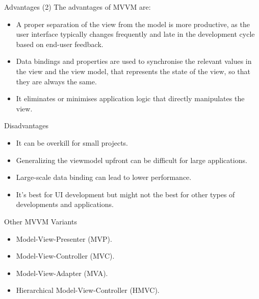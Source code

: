 \documentclass[aspectratio=169, table]{beamer}
\begin{document}
	
		\begin{frame}{Advantages (2)}
		The advantages of MVVM are:
		\begin{itemize}
		
			\item A proper separation of the view from the model is more productive, as the user interface typically changes frequently and late in the development cycle based on end-user feedback.
			\item Data bindings and properties are used to synchronise the relevant values in the view and the view model, that represents the state of the view, so that they are always the same.
			\item It eliminates or minimises application logic that directly manipulates the view. 
			
		\end{itemize}
	\end{frame}
	
	\begin{frame}{Disadvantages}
		\begin{itemize}
			\item It can be overkill for small projects. 
			\item Generalizing the viewmodel upfront can be difficult for large applications.
			\item Large-scale data binding can lead to lower performance.
			\item It's best for UI development but might not the best for other types of developments and  applications.
		\end{itemize}
	\end{frame}
	
	\begin{frame}{Other MVVM Variants}
		\begin{itemize}
			\item Model-View-Presenter (MVP).
			\item Model-View-Controller (MVC).
			\item Model-View-Adapter (MVA).
			\item Hierarchical Model-View-Controller (HMVC).
			
		\end{itemize}
	\end{frame}
	
\end{document}
